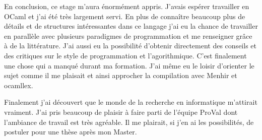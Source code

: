 \documentclass[a4paper]{article}
\begin{document}
En conclusion, ce stage m'aura énormément appris. J'avais espérer travailler 
en OCaml et j'ai été très largement servi. En plus de connaître beaucoup
plus de détails et de structures intéressantes dans ce langage j'ai eu la 
chance de travailler en parallèle avec plusieurs paradigmes de programmation et
me renseigner grâce à de la littérature.
J'ai aussi eu la possibilité d'obtenir directement des conseils 
et des critiques 
sur le style de programmation et l'agorithmique. C'est finalement une chose qui
a manqué durant ma formation.
J'ai même eu le loisir d'orienter le sujet comme il me plaisait et ainsi 
approcher la compilation avec Menhir et ocamllex. 

Finalement j'ai 
découvert que le monde de la recherche en informatique m'attirait vraiment. 
J'ai pris beaucoup de plaisir à faire parti de l'équipe ProVal dont l'ambiance 
de travail est très agréable. Il me plairait, si j'en ai les possibilités, 
de postuler pour une thèse après mon Master.



\newpage
{}


\end{document}
